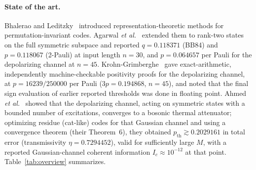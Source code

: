 \documentclass[aps,pra,reprint,superscriptaddress,nofootinbib,longbibliography,floatfix]{revtex4-2}
\theoremstyle{remark}
\newcommand{\Ic}{I_c}
\begin{document}
\paragraph*{State of the art.}
Bhalerao and Leditzky~\cite{bhalerao2025permutation} introduced representation-theoretic methods for
permutation-invariant codes. Agarwal \textit{et al.}~\cite{agarwal2026symmetry} extended them to rank-two
states on the full symmetric subspace and reported $q=0.118371$ (BB84) and $p=0.118067$ (2-Pauli) at
input length $n=30$, and $p=0.064657$ per Pauli for the depolarizing channel at $n=45$.
Krohn-Grimberghe~\cite{krohn2026certified} gave exact-arithmetic, independently machine-checkable
positivity proofs for the depolarizing channel, at $p=16239/250000$ per Pauli ($3p=0.194868$, $n=45$), and noted
that the final sign evaluation of earlier reported thresholds was done in floating point. Ahmed
\textit{et al.}~\cite{ahmed2026choir} showed that the depolarizing channel, acting on symmetric states
with a bounded number of excitations, converges to a bosonic thermal attenuator; optimizing residue
(cat-like) codes for that Gaussian channel and using a convergence theorem (their Theorem~6), they
obtained $p_{\mathrm{th}}\gtrsim 0.2029161$ in total error (transmissivity $\eta=0.7294452$), valid for
sufficiently large $M$, with a reported Gaussian-channel coherent information
$\Ic\approx10^{-12}$ at that point. Table~\ref{tab:overview} summarizes.
\end{document}

